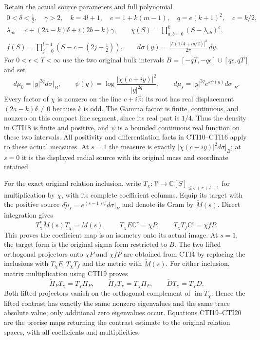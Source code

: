 Retain the actual source parameters and full polynomial
\[
 \begin{gathered}
 0<\delta<\tfrac12,\quad\gamma>2,\quad k=4l+1,\quad
 e=1+k(m-1),\quad q=e(k+1)^2,\quad c=k/2,\\
 \lambda_{ab}=c+(2a-k)\delta+i(2b-k)\gamma,\qquad
 \chi(S)=\prod_{a,b=0}^k(S-\lambda_{ab})^e,\\
 f(S)=\prod_{j=0}^{l-1}(S-c-(2j+\tfrac12)),\qquad
 d\sigma(y)=\frac{|\Gamma(1/4+iy/2)|^2}{2\pi}\,dy.
 \end{gathered}
 \tag{CTI17}
\]
For $0<\epsilon<T<\infty$ use the two original bulk intervals
$B=[-qT,-q\epsilon]\cup[q\epsilon,qT]$ and set
\[
 d\mu_0=|y|^{2q}d\sigma\big|_B,
 \qquad\psi(y)=\log\frac{|\chi(c+iy)|^2}{|y|^{2q}},
 \qquad d\mu_s=|y|^{2q}e^{s\psi(y)}d\sigma\big|_B.
 \tag{CTI18}
\]
Every factor of $\chi$ is nonzero on the line $c+i\mathbb R$:
its root has real displacement $(2a-k)\delta\ne0$ because $k$
is odd. The Gamma factor is finite, continuous, and nonzero on
this compact line segment, since its real part is $1/4$.
Thus the density in CTI18 is finite and positive, and $\psi$ is
a bounded continuous real function on these two intervals.
All positivity and differentiation facts in CTI10--CTI16 apply
to these actual measures. At $s=1$ the measure is exactly
$|\chi(c+iy)|^2d\sigma|_B$; at $s=0$ it is the displayed radial
source with its original mass and coordinate retained.

For the exact original relation inclusion, write
$T_\chi:\mathcal V\to\mathbb C[S]_{\leq q+r+l-1}$ for
multiplication by $\chi$, with its complete coefficient columns.
Equip its target with the positive source
$d\widetilde\mu_s=e^{(s-1)\psi}d\sigma|_B$ and denote its Gram
by $\widetilde M(s)$. Direct integration gives
\[
 T_\chi^*\widetilde M(s)T_\chi=M(s),\qquad
 T_\chi E\mathbb C^r=\chi P,\qquad
 T_\chi T_f\mathbb C^r=\chi fP.
 \tag{CTI19}
\]
This proves the coefficient map is an isometry onto its actual
image. At $s=1$, the target form is the original sigma form
restricted to $B$. The two lifted orthogonal projectors onto
$\chi P$ and $\chi fP$ are obtained from CTI4 by replacing
the inclusions with $T_\chi E,T_\chi T_f$ and the metric with
$\widetilde M(s)$. For either inclusion, matrix multiplication
using CTI19 proves
\[
 \widetilde\Pi_P T_\chi=T_\chi\Pi_P,\qquad
 \widetilde\Pi_F T_\chi=T_\chi\Pi_F,
 \qquad\widetilde D T_\chi=T_\chi D.
 \tag{CTI20}
\]
Both lifted projectors vanish on the orthogonal complement of
$\operatorname{im}T_\chi$. Hence the lifted contrast has exactly
the same nonzero eigenvalues and the same trace absolute value;
only additional zero eigenvalues occur. Equations CTI19--CTI20
are the precise maps returning the contrast estimate to the
original relation spaces, with all coefficients and multiplicities.

